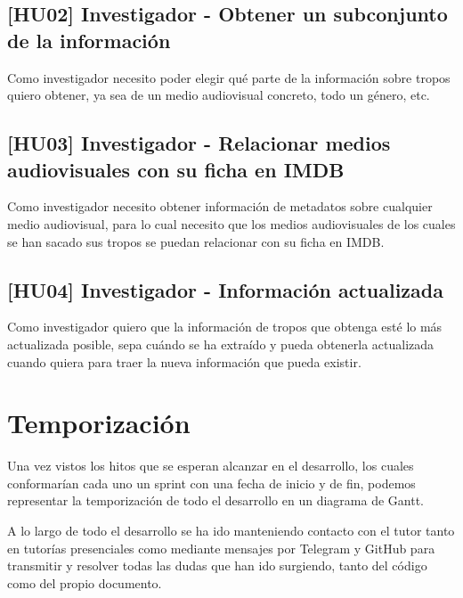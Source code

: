 \subsection{[HU02] Investigador - Obtener un subconjunto de la información}
Como investigador necesito poder elegir qué parte de la información sobre tropos quiero obtener, ya sea de un medio audiovisual concreto, todo un género, etc.

\subsection{[HU03] Investigador - Relacionar medios audiovisuales con su ficha en IMDB}
Como investigador necesito obtener información de metadatos sobre cualquier medio audiovisual, para lo cual necesito que los medios audiovisuales de los cuales se han sacado sus tropos se puedan relacionar con su ficha en IMDB.

\subsection{[HU04] Investigador - Información actualizada}
Como investigador quiero que la información de tropos que obtenga esté lo más actualizada posible, sepa cuándo se ha extraído y pueda obtenerla actualizada cuando quiera para traer la nueva información que pueda existir.

\section{Temporización}
Una vez vistos los hitos que se esperan alcanzar en el desarrollo, los cuales conformarían cada uno un sprint con una fecha de inicio y de fin, podemos representar la temporización de todo el desarrollo en un diagrama de Gantt.

A lo largo de todo el desarrollo se ha ido manteniendo contacto con el tutor tanto en tutorías presenciales como mediante mensajes por Telegram y GitHub para transmitir y resolver todas las dudas que han ido surgiendo, tanto del código como del propio documento.